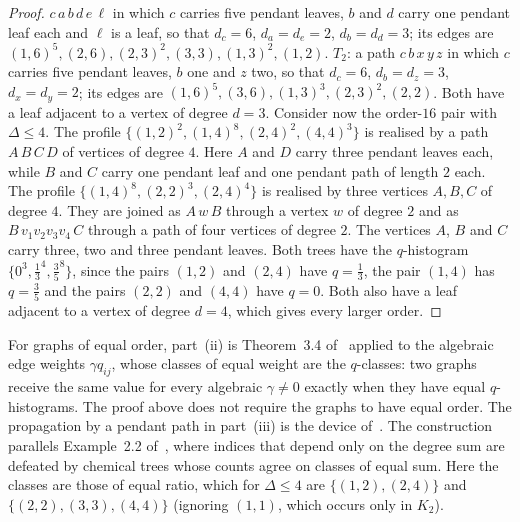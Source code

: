 \documentclass[a5paper, 10pt]{article}
\theoremstyle{plain}
\theoremstyle{remark}
\theoremstyle{definition}
\begin{document}
\begin{proof}
  $c\,a\,b\,d\,e\,\ell$ in which $c$ carries five pendant leaves, $b$ and
  $d$ carry one pendant leaf each and $\ell$ is a leaf, so that
  $d_c = 6$, $d_a = d_e = 2$, $d_b = d_d = 3$; its edges are
  $(1,6)^{5}, (2,6), (2,3)^{2}, (3,3), (1,3)^{2}, (1,2)$. $T_2$: a path
  $c\,b\,x\,y\,z$ in which $c$ carries five pendant leaves, $b$ one and
  $z$ two, so that $d_c = 6$, $d_b = d_z = 3$, $d_x = d_y = 2$; its
  edges are $(1,6)^{5}, (3,6), (1,3)^{3}, (2,3)^{2}, (2,2)$. Both have a
  leaf adjacent to a vertex of degree $d = 3$. Consider now the order-$16$ pair with $\Delta \le 4$. The profile
  $\{(1,2)^{2}, (1,4)^{8}, (2,4)^{2}, (4,4)^{3}\}$ is realised by a path
  $A\,B\,C\,D$ of vertices of degree $4$. Here $A$ and $D$ carry three
  pendant leaves each, while $B$ and $C$ carry one pendant leaf and one
  pendant path of length $2$ each. The profile $\{(1,4)^{8}, (2,2)^{3}, (2,4)^{4}\}$ is realised by
  three vertices $A, B, C$ of degree $4$. They are joined as $A\,w\,B$
  through a vertex $w$ of degree $2$ and as $B\,v_1 v_2 v_3 v_4\,C$
  through a path of four
  vertices of degree $2$. The vertices $A$, $B$ and $C$ carry three, two
  and three pendant leaves. Both trees have the
  $q$-histogram $\{0^{3}, \tfrac13^{4}, \tfrac35^{8}\}$, since the pairs
  $(1,2)$ and $(2,4)$ have $q = \tfrac13$, the pair $(1,4)$ has
  $q = \tfrac35$ and the pairs $(2,2)$ and $(4,4)$ have $q = 0$. Both also
  have a leaf adjacent to a vertex of degree $d = 4$, which gives every
  larger order.
  \end{proof}

  For graphs of equal order, part~(ii) is Theorem~3.4 of~\cite{Rada2019ExpVDB} applied to the algebraic edge weights $\gamma q_{ij}$, whose classes of equal weight are the $q$-classes: two graphs receive the same value for every algebraic $\gamma \neq 0$ exactly when they have equal $q$-histograms. The proof above does not require the graphs to have equal order. The propagation by a pendant path in part~(iii) is the device of~\cite{Rada2026LinearVDB}. The construction parallels Example~2.2 of~\cite{RadaRodriguezSigarreta2022Weak}, where indices that depend only on the degree sum are defeated by chemical trees whose counts agree on classes of equal sum. Here the classes are those of equal ratio, which for $\Delta \le 4$ are $\{(1,2),(2,4)\}$ and $\{(2,2),(3,3),(4,4)\}$ (ignoring $(1,1)$, which occurs only in $K_2$).
\end{document}

